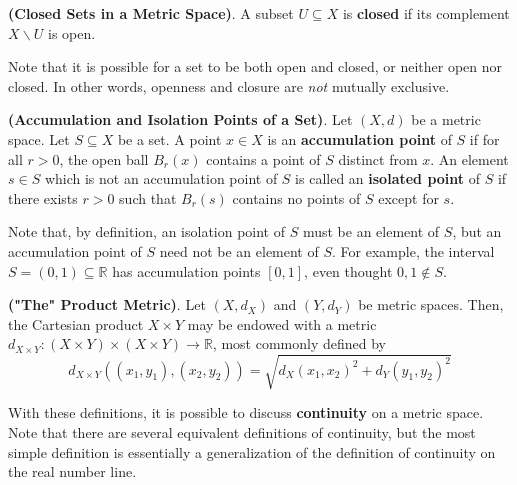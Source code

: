 \begin{defn}
    \textbf{(Closed Sets in a Metric Space)}. A subset $U\subseteq X$ is \textbf{closed} if its complement $X\backslash U$ is open.
\end{defn}
Note that it is possible for a set to be both open and closed, or neither open nor closed. In other words, openness and closure are \textit{not} mutually exclusive.

\begin{defn}
    \textbf{(Accumulation and Isolation Points of a Set)}. Let $(X,d)$ be a metric space. Let $S\subseteq X$ be a set. A point $x\in X$ is an \textbf{accumulation point} of $S$ if for all $r>0$, the open ball $B_r(x)$ contains a point of $S$ distinct from $x$. An element $s\in S$ which is not an accumulation point of $S$ is called an \textbf{isolated point} of $S$ if there exists $r>0$ such that $B_r(s)$ contains no points of $S$ except for $s$.
\end{defn}

Note that, by definition, an isolation point of $S$ must be an element of $S$, but an accumulation point of $S$ need not be an element of $S$. For example, the interval $S=(0,1)\subseteq \mathbb{R}$ has accumulation points $[0,1]$, even thought $0,1\notin S$.

\begin{defn}
    \textbf{("The" Product Metric)}. Let $(X,d_X)$ and $(Y,d_Y)$ be metric spaces. Then, the Cartesian product $X\times Y$ may be endowed with a metric $d_{X\times Y}: (X\times Y)\times (X\times Y)\to \mathbb{R}$, most commonly defined by \[d_{X\times Y}((x_1,y_1),(x_2,y_2)) = \sqrt{d_X(x_1,x_2)^2+d_Y(y_1,y_2)^2}\]
\end{defn}

With these definitions, it is possible to discuss \textbf{continuity} on a metric space. Note that there are several equivalent definitions of continuity, but the most simple definition is essentially a generalization of the definition of continuity on the real number line.

